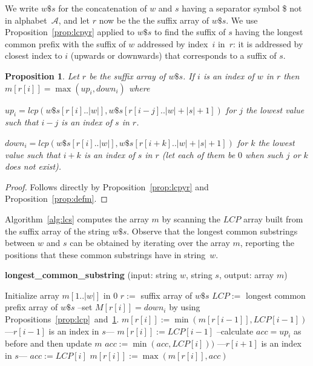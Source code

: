 \documentclass[submission]{dmtcs}
\newcommand\+[1]{\mathcal{#1}}
\newtheorem{proposition}[theorem]{Proposition}
\newenvironment{my_enumerate}{\begin{enumerate}
  \setlength{\itemsep}{1pt}
  \setlength{\parskip}{0pt}
  \setlength{\parsep}{0pt}}{\end{enumerate}}
\begin{document}
We write $w\$s$ for the concatenation of $w$ and $s$
having a separator symbol \$  not  in alphabet~$\+A$,
and let $r$ now be the the suffix array of $w\$s$.
We use Proposition~\ref{prop:lcpyr} applied to $w\$s$
to find the suffix of $s$ having the  longest common 
prefix with the suffix of $w$  addressed by index~$i$ in~$r$:
it is addressed by  closest index to $i$ (upwards or downwards)
that corresponds to a suffix of $s$.

\begin{proposition}
\label{prop:updown}
Let $r$ be the suffix array of $w\$s$.
If  $i$ is an index of $w$ in $r$ then 
$m[r[i]] = \max (up_i, down_i)$
where 
\begin{my_enumerate}
\item[] $up_i = lcp(w\$s[r[i]..|w|], w\$s[r[i-j] .. |w|+|s|+1])$ for $j$
the lowest value such that $i-j$ is an index of $s$ in $r$.

\item[] $down_i = lcp(w\$s[r[i]..|w|], w\$s[r[i+k] .. |w|+|s|+1])$ for $k$
the lowest value such that $i+k$ is an index of $s$ in $r$
(let each of them be $0$ when such $j$ or $k$ does not exist).
\end{my_enumerate}
\end{proposition}

\begin{proof}
Follows directly by Proposition~\ref{prop:lcpyr} and Proposition~\ref{prop:defm}.
\end{proof}

Algorithm~\ref{alg:lcs} computes the array $m$ by scanning the 
$LCP$ array built from the suffix array of the
string $w\$s$.
Observe that the longest common
substrings between $w$ and $s$ can be obtained  
by iterating over the array $m$, reporting the positions
that these common substrings have in string~$w$.

\begin{algorithm}[th]
\caption{ {\bf longest\_common\_substring}
(input: string $w$, string $s$,  output: array $m$)\label{alg:lcs}}
\begin{algorithmic}
\STATE
\STATE  Initialize array $m[1..|w|]$  in $0$ 
\STATE $r :=$ suffix array of $w\$s$
\STATE $LCP :=$ longest common prefix array of $w\$s$
\STATE --set $M[r[i]] = down_i$ by using Propositions~\ref{prop:lcp}~and~\ref{prop:updown}.
		\STATE $m[r[i]] := \min(m[r[i-1]], LCP[i-1])$
	\ELSE \STATE ---{$r[i-1]$ is an index in $s$}---
		\STATE $m[r[i]] :=  LCP[i-1]$
	\ENDIF
\ENDFOR
\STATE --calculate $acc = up_i$ as before and then update $m$
		\STATE $acc := \min(acc, LCP[i]))$
	\ELSE \STATE ---{$r[i+1]$ is an index in $s$}---
		\STATE $acc := LCP[i]$
	\ENDIF
	\STATE $m[r[i]] := \max(m[r[i]], acc)$
\ENDFOR
\STATE
\end{algorithmic}
\end{algorithm}
\end{document}
